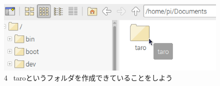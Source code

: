 \begin{figure}[ht]
  \centering
  \begin{minipage}{0.8\textwidth}
  \includegraphics[width=\linewidth]{text01-img/textbook-img040.png}
    4
    \ taroというフォルダを作成できていることをしよう
  \end{minipage}

\end{figure}
\clearpage



